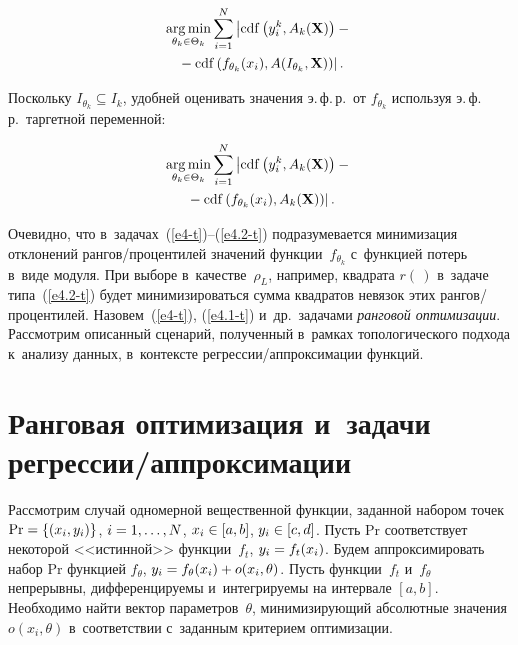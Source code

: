 \begin{multicols}{2}
\vspace*{-6pt}

\noindent
     \begin{multline}
     \mathop{\mathrm{arg}\,\mathrm{min}}\limits_{\theta_k\in \Theta_k} \sum\limits^N_{i=1} \left\vert 
\mathrm{cdf} \left( y_i^k, {A}_k(\mathbf{X})\right) -{}\right.\\
\left.{}-\mathrm{cdf} \left( 
f_{\theta_k} (x_i), {A}(I_{\theta_k},\mathbf{X})\right)\right\vert.
     \label{e4.1-t}
     \end{multline}
     
     \vspace*{-3pt}

\noindent
     Поскольку $I_{\theta_k}\subseteq I_k$, удобней оценивать значения 
э.\,ф.\,р.\ от $f_{\theta_k}$ используя э.\,ф.\,р.\ таргетной переменной:

\vspace*{-6pt}

\noindent
     \begin{multline}
     \mathop{\mathrm{arg}\,\mathrm{min}}\limits_{\theta_k\in \Theta_k} \sum\limits^N_{i=1} \left\vert 
\mathrm{cdf} \left( y_i^k, {A}_k(\mathbf{X})\right) -{}\right.\\
\left.{}-\mathrm{cdf}\left( 
f_{\theta_k}(x_i),{A}_k(\mathbf{X})\right)\right\vert.
     \label{e4.2-t}
     \end{multline}
     
     \vspace*{-3pt}

\noindent
Очевидно, что в~задачах~(\ref{e4-t})--(\ref{e4.2-t}) 
подразумевается минимизация отклонений ран\-гов/про\-цен\-ти\-лей значений 
функции~$f_{\theta_k}$ с~функцией потерь в~виде модуля. При выборе 
в~качестве~$\rho_L$, например, квад\-ра\-та $r(\,)$ в~задаче типа~(\ref{e4.2-t}) 
будет минимизироваться сумма квадратов невязок этих рангов/процентилей. 
Назовем~(\ref{e4-t}), (\ref{e4.1-t}) и~др.\ задачами \textit{ранговой 
оптимизации}. Рассмотрим описанный сценарий, полученный в~рамках 
топологического подхода к~анализу данных, в~контексте  
ре\-грес\-сии/ап\-прок\-си\-ма\-ции функций.

\section{Ранговая оптимизация и~задачи регрессии/аппроксимации}

    Рассмотрим случай одномерной вещественной функции, заданной 
набором точек $\mathrm{Pr}\hm= \{ (x_i, y_i)\}$, $i\hm=1,\ldots,N$, $x_i\hm\in 
[a,b]$, $y_i\hm\in [c,d]$. Пусть Pr соответствует некоторой <<истинной>> 
функции~$f_t$, $y_i\hm= f_t(x_i)$. Будем аппроксимировать набор Pr функцией 
$f_\theta$, $y_i\hm= f_\theta(x_i) \hm+o(x_i,\theta)$. Пусть функции~$f_t$ 
и~$f_\theta$ непрерывны, дифференцируемы и~интегрируемы на интервале 
$[a,b]$. Необходимо найти вектор параметров~$\theta$, минимизирующий 
абсолютные значения $o(x_i,\theta)$ в~соответствии с~заданным критерием 
оптимизации. 


\end{multicols}
